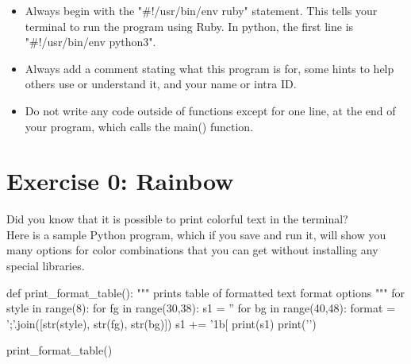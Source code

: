 \documentclass{42-en}
\begin{document}
\begin{itemize}
	\item Always begin with the "\#!/usr/bin/env ruby" statement. This tells your terminal to run the program using Ruby. In python, the first line is "\#!/usr/bin/env python3".
	\item Always add a comment stating what this program is for, some hints to help others use or understand it, and your name or intra ID.
	\item Do not write any code outside of functions except for one line, at the end of your program, which calls the main() function.
\end{itemize}

\startexercices


\chapter{Exercise 0: Rainbow}
\makeheaderfiles

Did you know that it is possible to print colorful text in the terminal?\\

Here is a sample Python program, which if you save and run it, will show you many options for color combinations that you can get without installing any special libraries. 

\begin{42pycode}
def print_format_table():
    """
    prints table of formatted text format options
    """
    for style in range(8):
        for fg in range(30,38):
            s1 = ''
            for bg in range(40,48):
                format = ';'.join([str(style), str(fg), str(bg)])
                s1 += '\x1b[%
            print(s1)
        print('\n')

print_format_table()
\end{42pycode}
\end{document}
